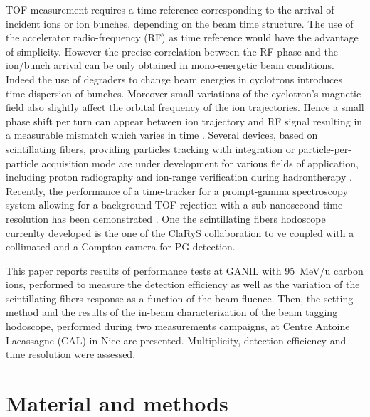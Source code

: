\documentclass[a4paper,11pt]{article}
\begin{document}
TOF measurement requires a time reference corresponding to the arrival of incident ions or ion bunches, depending on the beam time structure. The use of the accelerator radio-frequency (RF) as time reference would have the advantage of simplicity. However the precise correlation between the RF phase and the ion/bunch arrival can be only obtained in mono-energetic beam conditions. 
Indeed the use of degraders to change beam energies in cyclotrons introduces time dispersion of bunches. Moreover small variations of the cyclotron’s magnetic field also slightly affect the orbital frequency of the ion trajectories. Hence a small phase shift per turn can appear between ion trajectory and RF signal resulting in a measurable mismatch which varies in time \cite{Werner2019}. 
Several devices, based on scintillating fibers, providing particles tracking with integration \cite{Leverington2018} or particle-per-particle \cite{Horikawa2004, Achenbach2008, Braccini2012} acquisition mode are under development for various fields of application, including proton radiography \cite{Presti2013} and ion-range verification during hadrontherapy \cite{PAPA2016}. Recently, the performance of a time-tracker for a prompt-gamma spectroscopy system allowing for a background TOF rejection with a sub-nanosecond time resolution has been demonstrated \cite{Martins2020}. One the scintillating fibers hodoscope currenlty developed is the one of the ClaRyS collaboration to ve coupled with a collimated and a Compton camera for PG detection.

This paper reports results of performance tests at GANIL with 95~MeV/u carbon ions, performed to measure the detection efficiency as well as the variation of the scintillating fibers response as a function of the beam fluence. Then, the setting method and the results of the in-beam characterization of the beam tagging hodoscope, performed during two measurements campaigns, at Centre Antoine Lacassagne (CAL) in Nice are presented. Multiplicity, detection efficiency and time resolution were assessed.

\section{Material and methods}
\end{document}
